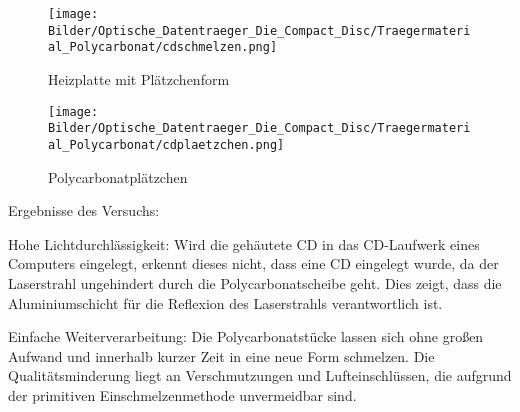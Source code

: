 {    \begin{figure}[h]
        \begin{center}
            \begin{minipage}[t]{0.45\textwidth}
                \begin{center}
                    \texttt{[image: Bilder/Optische\_Datentraeger\_Die\_Compact\_Disc/Traegermaterial\_Polycarbonat/cdschmelzen.png]}
                    \caption[Heizplatte mit Plätzchenform]{Heizplatte mit Plätzchenform}
                    \label{fig:cdschmelzen}
                \end{center}
            \end{minipage}
            \hspace{0.025\textwidth}
            \begin{minipage}[t]{0.45\textwidth}
                \begin{center}
                    \texttt{[image: Bilder/Optische\_Datentraeger\_Die\_Compact\_Disc/Traegermaterial\_Polycarbonat/cdplaetzchen.png]}
                    \caption[\glqq Polycarbonatplätzchen\grqq{}]{\glqq Polycarbonatplätzchen\grqq{}}
                    \label{fig:cdplaetzchen}
                \end{center}
            \end{minipage}
        \end{center}
    \end{figure}
}{}

Ergebnisse des Versuchs:
\begin{enumerate*}
    \item Hohe Lichtdurchlässigkeit: Wird die \glqq gehäutete\grqq{} CD in das CD-Laufwerk eines Computers eingelegt, erkennt dieses nicht, dass eine CD eingelegt wurde, da der Laserstrahl ungehindert durch die Polycarbonatscheibe geht. Dies zeigt, dass die Aluminiumschicht für die Reflexion des Laserstrahls verantwortlich ist.
    \item Einfache Weiterverarbeitung: Die Polycarbonatstücke lassen sich ohne großen Aufwand und innerhalb kurzer Zeit in eine neue Form schmelzen. Die Qualitätsminderung liegt an Verschmutzungen und Lufteinschlüssen, die aufgrund der primitiven Einschmelzenmethode unvermeidbar sind.
\end{enumerate*}
